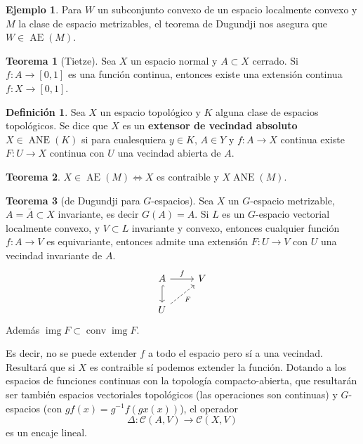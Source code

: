 \documentclass[spanish]{article}
\theoremstyle{definition}
\newtheorem*{defn}{Definición}
\newtheorem*{teo}{Teorema}
\newtheorem*{ejem}{Ejemplo}
\DeclareMathOperator{\img}{img}
\DeclareMathOperator{\conv}{conv}
\DeclareMathOperator{\AEx}{AE}
\DeclareMathOperator{\ANEx}{ANE}
\begin{document}
\begin{ejem}
	Para $W$ un subconjunto convexo de un espacio localmente convexo y $M$ la clase de espacio metrizables, el teorema de Dugundji nos asegura que $W\in\AEx(M)$.
\end{ejem}
\begin{teo}[Tietze]
	Sea $X$ un espacio normal y $A\subset X$ cerrado. Si $f:A\to[0,1]$ es una función continua, entonces existe una extensión continua $f:X\to[0,1]$.
\end{teo}
\begin{defn}
	Sea $X$ un espacio topológico y $K$ alguna clase de espacios topológicos. Se dice que $X$ es un \textbf{extensor de vecindad absoluto} $X\in\ANEx(K)$ si para cualesquiera $y\in K$, $A\in Y$ y $f:A\to X$ continua existe $F:U\to X$ continua con $U$ una vecindad abierta de $A$.
\end{defn}
\begin{teo}
	$X\in\AEx(M)\iff X$ es contraible y $X\ANEx(M)$.
\end{teo}
\begin{teo}[de Dugundji para $G$-espacios]
	Sea $X$ un $G$-espacio metrizable, $A=\bar{A}\subset X$ invariante, es decir $G(A)=A$. Si $L$ es un $G$-espacio vectorial localmente convexo, y $V\subset L$ invariante y convexo, entonces cualquier función $f:A\to V$ es equivariante, entonces admite una extensión $F:U\to V$ con $U$ una vecindad invariante de $A$.
	\[\begin{tikzcd}
		A\arrow[r,"f"]\arrow[hook,d]&V\\
		U\arrow[ur,dashed,"F",swap]
	\end{tikzcd}\]
	Además $\img F\subset\conv\img F$.
\end{teo}
Es decir, no se puede extender $f$ a todo el espacio pero sí a una vecindad. Resultará que si $X$ es contraible sí podemos extender la función. Dotando a los espacios de funciones continuas con la topología compacto-abierta, que resultarán ser también espacios vectoriales topológicos (las operaciones son continuas) y $G$-espacios (con $gf(x)=g^{-1}f(gx(x))$), el operador
\[\Delta:\mathcal{C}(A,V)\to\mathcal{C}(X,V)\]
es un encaje lineal.
\end{document}

